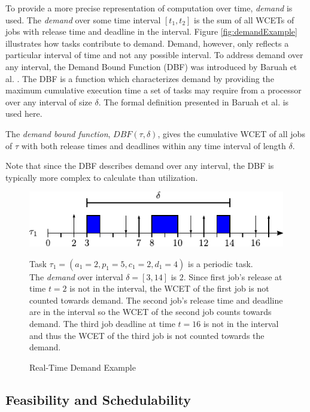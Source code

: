 To provide a more precise representation of computation over time, \textit{demand} is used.
The \textit{demand} over some time interval $[t_1,t_2]$ is the sum of all WCETs of jobs with release time and deadline in the interval.
Figure \ref{fig:demandExample} illustrates how tasks contribute to demand.
Demand, however, only reflects a particular interval of time and not any possible interval.
To address demand over any interval, the Demand Bound Function (DBF) was introduced by Baruah et al. \cite{baruah_preemptively_1990}.
The DBF is a function which characterizes demand by providing the maximum cumulative execution time a set of tasks may require from a processor over any interval of size $\delta$. 
The formal definition presented in Baruah et al. \cite{baruah_preemptively_1990} is used here.
\begin{definition}\label{def:dbf}
    The \textit{demand bound function}, $DBF(\tau,\delta)$, gives the cumulative WCET of all jobs of $\tau$ with both release times and deadlines within any time interval of length $\delta$.
\end{definition}
Note that since the DBF describes demand over any interval, the DBF is typically more complex to calculate than utilization.

\begin{figure}[!htbp]
    \centering
    \includegraphics[width=0.75\linewidth]{fig/demandExample.pdf}
    \caption{Real-Time Demand Example}
    Task $\tau_1 = (a_1=2, p_1 = 5, c_1=2, d_1=4)$ is a periodic task.\\
    The \textit{demand} over interval $\delta = [3,14]$ is $2$.
    Since first job's release at time $t=2$ is not in the interval, the WCET of the first job is not counted towards demand.
    The second job's release time and deadline are in the interval so the WCET of the second job counts towards demand.
    The third job deadline at time $t=16$ is not in the interval and thus the WCET of the third job is not counted towards the demand.
    \label{fig:rt-demand}
\end{figure}

\subsection{Feasibility and Schedulability}

